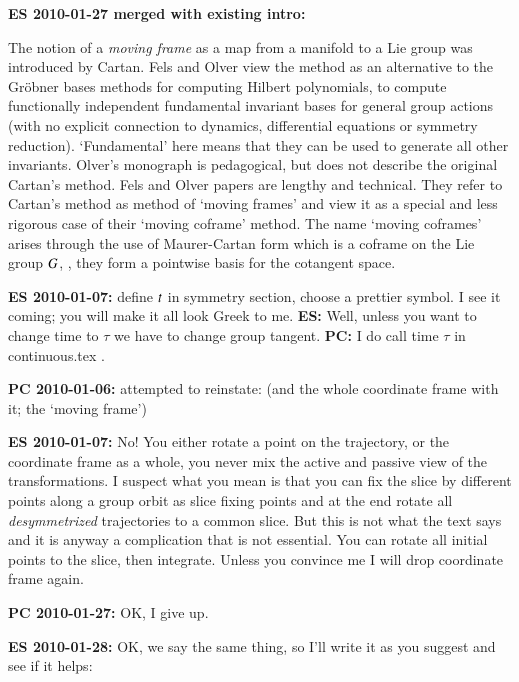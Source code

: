 {\bf ES 2010-01-27 merged with existing intro:}

The notion of a {\em moving frame} as a map from a manifold
to a Lie group was introduced by Cartan. Fels
and Olver view the method as an alternative to the Gr\"obner
bases methods for computing Hilbert polynomials, to compute
functionally independent fundamental invariant bases for
general group actions (with no explicit connection to
dynamics, differential equations or symmetry reduction).
`Fundamental' here means that they can be used to generate
all other invariants. Olver's monograph is
pedagogical, but does not describe the original Cartan's
method. Fels and Olver papers are
lengthy and technical. They refer to Cartan's method as
method of `moving frames' and view it as a special and less
rigorous case of their `moving coframe' method. The name
`moving coframes' arises through the use of Maurer-Cartan
form which is a coframe on the Lie group $G$, \ie, they
form a pointwise basis for the cotangent space.

{\bf ES 2010-01-07:}
define $t$ in symmetry section, choose a prettier
symbol. I see it coming; you will make it all look Greek to
me. {\bf ES:} Well, unless 	you want to change time to $\tau$
we have to change 	group tangent. {\bf PC:} I do call time
$\tau$ in continuous.tex .

{\bf PC 2010-01-06:} attempted to reinstate: (and the whole
coordinate frame with it; the `moving frame')

{\bf ES 2010-01-07:} No! You either rotate a point on the trajectory, or the coordinate
	frame as a whole, you never mix the active and passive view of the transformations.
	I suspect what you mean is that you can fix the slice by different points along
	a group orbit as slice fixing points and at the end rotate all \emph{desymmetrized} trajectories
	to a common slice. But this is not what the text says and it is anyway a complication
	that is not essential. You can rotate all initial points to the slice, then integrate.
	Unless you convince me I will drop coordinate frame again.

{\bf PC 2010-01-27:} OK, I give up.

{\bf ES 2010-01-28:} OK, we say the same thing, so I'll write it as you suggest and see
			if it helps:

